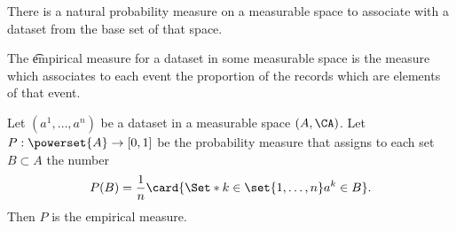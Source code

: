 

There is a natural probability measure on a measurable space to associate with a dataset from the base set of that space.


The \t{empirical measure} for a dataset in some measurable space is the measure which associates to each event the proportion of the records which are elements of that event.


Let $(a^1, \dots, a^n)$ be a dataset in a measurable space $(A, \CA)$.
Let $P: \powerset{A} \to [0, 1]$ be the probability measure that assigns to each set $B \subset A$ the number
$$
P(B) = \frac{1}{n} \card{\Set*{k \in \set{1, \dots, n}}{a^k \in B}}.
$$
Then $P$ is the empirical measure.

\blankpage
